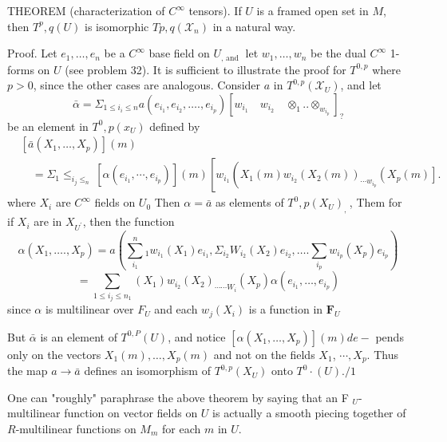 \documentclass[10pt]{article}
\begin{document}
THEOREM (characterization of $C^{\infty}$ tensors). If $U$ is a framed open set in $M$, then $T^{p}, q(U)$ is isomorphic $T p, q\left(\mathcal{X}_{n}\right)$ in a natural way.

Proof. Let $e_{1}, \ldots, e_{n}$ be a $C^{\infty}$ base field on $U_{\text {, and }}$ let $w_{1}, \ldots, w_{n}$ be the dual $C^{\infty}$ 1-forms on $U$ (see problem 32). It is sufficient to illustrate the proof for $T^{0, p}$ where $p>0$, since the other cases are analogous. Consider $a$ in $T^{0, p}\left(\mathcal{X}_{U}\right)$, and let
$$
\bar{\alpha}=\Sigma_{1 \leq i_{i} \leq n} a\left(e_{i_{1}}, e_{i_{2}}, \ldots ., e_{i_{p}}\right)\left[w_{i_{1}} \quad w_{i_{2}} \quad \otimes_{1} . . \otimes_{w_{i_{p}}}\right]_{?}
$$
be an element in $T^{0}, p\left(x_{U}\right)$ defined by
$$
\begin{aligned}
&{\left[\bar{a}\left(X_{1}, \ldots, X_{p}\right)\right](m)} \\
&\quad=\Sigma_{1} \leq_{i_{j} \leq_{n}}\left[\alpha\left(e_{i_{1}}, \cdots, e_{i_{p}}\right)\right](m)\left[w _ { i _ { 1 } } \left(X_{1}(m) w_{i_{2}}\left(X_{2}(m)\right)_{\cdots w_{i_{p}}}\left(X_{p}(m)\right] .\right.\right.
\end{aligned}
$$
where $X_{i}$ are $C^{\infty}$ fields on $U_{0}$ Then $\alpha=\bar{a}$ as elements of $T^{0}, p\left(X_{U}\right)_{\text {, }}$, Them for if $X_{i}$ are in $X_{U^{\prime}}$, then the function
$$
\alpha\left(X_{1}, \ldots ., X_{p}\right)=a\left(\sum_{i_{1}}^{n}{ }_{1} w_{i_{1}}\left(X_{1}\right) e_{i_{1}}, \Sigma_{i_{2}} W_{i_{2}}\left(X_{2}\right) e_{i_{2}}, \ldots . \sum_{i_{p}} w_{i_{p}}\left(X_{p}\right) e_{i_{p}}\right)
$$
$$
=\sum_{1 \leq i_{j} \leq n_{1}}\left(X_{1}\right) w_{i_{2}}\left(X_{2}\right)_{\cdots \cdots W_{i}}\left(X_{p}\right) \alpha\left(e_{i_{1}}, \ldots, e_{i_{p}}\right)
$$
since $\alpha$ is multilinear over $F_{U}$ and each $w_{j}\left(X_{i}\right)$ is a function in $\boldsymbol{F}_{U}$

But $\bar{\alpha}$ is an element of $T^{0, P}(U)$, and notice $\left[\alpha\left(X_{1}, \ldots, X_{p}\right)\right](m) d e-$ pends only on the vectors $X_{1}(m), \ldots, X_{p}(m)$ and not on the fields $X_{1}$, $\cdots, X_{p} .$ Thus the map $a \rightarrow \bar{a}$ defines an isomorphism of $T^{0, p}\left(X_{U}\right)$ onto $T^{0} \cdot(U) . / 1$

One can "roughly" paraphrase the above theorem by saying that an F $_{U}$-multilinear function on vector fields on $U$ is actually a smooth piecing together of $R$-multilinear functions on $M_{m}$ for each $m$ in $U$.
\end{document}

